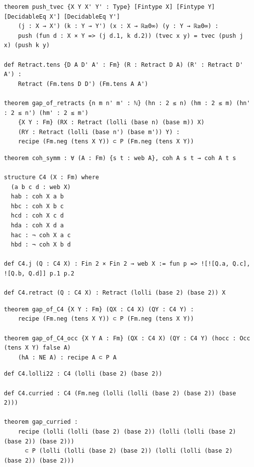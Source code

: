 \label{lean:retract-tens}
\begin{lstlisting}
theorem push_tvec {X Y X' Y' : Type} [Fintype X] [Fintype Y] [DecidableEq X'] [DecidableEq Y']
    (j : X → X') (k : Y → Y') (x : X → ℝ≥0∞) (y : Y → ℝ≥0∞) :
    push (fun d : X × Y => (j d.1, k d.2)) (tvec x y) = tvec (push j x) (push k y)

def Retract.tens {D A D' A' : Fm} (R : Retract D A) (R' : Retract D' A') :
    Retract (Fm.tens D D') (Fm.tens A A')

theorem gap_of_retracts {n m n' m' : ℕ} (hn : 2 ≤ n) (hm : 2 ≤ m) (hn' : 2 ≤ n') (hm' : 2 ≤ m')
    {X Y : Fm} (RX : Retract (lolli (base n) (base m)) X)
    (RY : Retract (lolli (base n') (base m')) Y) :
    recipe (Fm.neg (tens X Y)) ⊂ P (Fm.neg (tens X Y))
\end{lstlisting}

\label{lean:c4-retract}
\begin{lstlisting}
theorem coh_symm : ∀ (A : Fm) {s t : web A}, coh A s t → coh A t s

structure C4 (X : Fm) where
  (a b c d : web X)
  hab : coh X a b
  hbc : coh X b c
  hcd : coh X c d
  hda : coh X d a
  hac : ¬ coh X a c
  hbd : ¬ coh X b d

def C4.j (Q : C4 X) : Fin 2 × Fin 2 → web X := fun p => ![![Q.a, Q.c], ![Q.b, Q.d]] p.1 p.2

def C4.retract (Q : C4 X) : Retract (lolli (base 2) (base 2)) X
\end{lstlisting}

\label{lean:gap-of-c4}
\begin{lstlisting}
theorem gap_of_C4 {X Y : Fm} (QX : C4 X) (QY : C4 Y) :
    recipe (Fm.neg (tens X Y)) ⊂ P (Fm.neg (tens X Y))

theorem gap_of_C4_occ {X Y A : Fm} (QX : C4 X) (QY : C4 Y) (hocc : Occ (tens X Y) false A)
    (hA : NE A) : recipe A ⊂ P A
\end{lstlisting}

\label{lean:gap-curried}
\begin{lstlisting}
def C4.lolli22 : C4 (lolli (base 2) (base 2))

def C4.curried : C4 (Fm.neg (lolli (lolli (base 2) (base 2)) (base 2)))

theorem gap_curried :
    recipe (lolli (lolli (base 2) (base 2)) (lolli (lolli (base 2) (base 2)) (base 2)))
      ⊂ P (lolli (lolli (base 2) (base 2)) (lolli (lolli (base 2) (base 2)) (base 2)))
\end{lstlisting}

